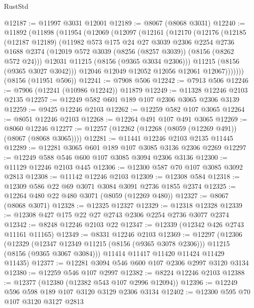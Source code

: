 \begin{lexlean}{RustStd}
\begin{coremodule}
{\begin{coremodule}
{{{{{{{{{{{{{{{{{{{{{{{{{{{{{{{{{{@12187 := @11997 @3031 @12001
@12189 := @8067 (@8068 @3031)
@12240 := @11892
    (@11898
      (@11954
        (@12069
          (@12097
            (@12161
              (@12170
                (@12176
                  (@12185
                    (@12187 @12189)
                    (@11982
                      @573
                      @175
                      @24
                      @27
                      @3039
                      @2306
                      @2254
                      @2736
                      @1688
                      @2374
                      (@12019 @572 @3039 (@8256 (@8257 @3039)) (@8156 (@8262 @572 @24)))
                      @12031
                      @11215
                      (@8156 (@9365 @3034 @2306)))
                    @11215
                    (@8156 (@9365 @3027 @3042)))
                  @12046
                  @12049
                  @12052
                  @12056
                  @12061
                  @12067)))))))
    (@8156 (@11951 @506))
@12241 := @7908 @506
@12242 := @7913 @506
@12246 := @7906 (@12241 (@10986 @12242)) @11879
@12249 := @11328 @12246 @2103 @2135
@12257 := @12249 @582 @601 @189 @107 @2306 @3065 @2306 @3139
@12259 := @9425 @12246 @2103
@12262 := @12259 @582 @107 @3065
@12264 := @8051 @12246 @2103
@12268 := @12264 @491 @107 @491 @3065
@12269 := @8060 @12246
@12277 := @12257 (@12262 (@12268 (@8059 (@12269 @491)) (@8067 (@8068 @3065))))
@12281 := @11441 @12246 @2103 @2135 @11445
@12289 := @12281 @3065 @601 @189 @107 @3085 @3136 @2306 @2269
@12297 := @12249 @588 @546 @600 @107 @3085 @3094 @2306 @3136
@12300 := @11129 @12246 @2103 @445
@12306 := @12300 @587 @70 @107 @3085 @3092 @2813
@12308 := @11142 @12246 @2103
@12309 := @12308 @584
@12318 := @12309 @586 @22 @69 @3071 @3084 @3091 @2736 @1855 @2374
@12325 := @12264 @480 @22 @480 @3071 (@8059 (@12269 @480))
@12327 := @8067 (@8068 @3071)
@12328 := @12325 @12327
@12329 := @12318 @12328
@12339 := @12308 @427 @175 @22 @27 @2743 @2306 @2254 @2736 @3077 @2374
@12342 := @8248 @12246 @2103 @22
@12347 := @12339 (@12342 @426 @2743 @11161 @11165)
@12349 := @8331 @12246 @2103
@12369 := @12297
    (@12306
      (@12329 (@12347 @12349 @11215 (@8156 (@9365 @3078 @2306))) @11215 (@8156 (@9365 @3067 @3084)))
      @11414
      @11417
      @11420
      @11424
      @11429
      @11435)
@12377 := @12281 @3094 @546 @600 @107 @2306 @2997 @3120 @3134
@12380 := @12259 @546 @107 @2997
@12382 := @8224 @12246 @2103
@12388 := @12377 (@12380 (@12382 @543 @107 @2996 @12094))
@12396 := @12249 @596 @598 @189 @107 @3120 @3129 @2306 @3134
@12402 := @12300 @595 @70 @107 @3120 @3127 @2813
}}}}}}}}}}}}}}}}}}}}}}}}}}}}}}}}}}
\end{coremodule}}
\end{coremodule}
\end{lexlean}
